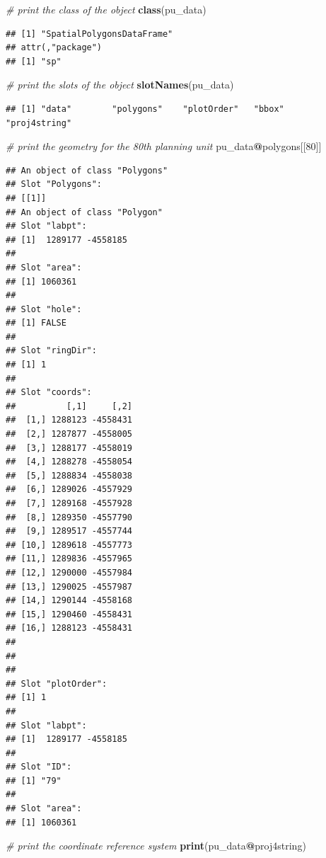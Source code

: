 \documentclass[12pt,]{book}
\newenvironment{Shaded}{\begin{snugshade}}{\end{snugshade}}
\newcommand{\KeywordTok}[1]{\textcolor[rgb]{0.13,0.29,0.53}{\textbf{#1}}}
\newcommand{\DecValTok}[1]{\textcolor[rgb]{0.00,0.00,0.81}{#1}}
\newcommand{\CommentTok}[1]{\textcolor[rgb]{0.56,0.35,0.01}{\textit{#1}}}
\newcommand{\OperatorTok}[1]{\textcolor[rgb]{0.81,0.36,0.00}{\textbf{#1}}}
\newcommand{\NormalTok}[1]{#1}
\begin{document}
\begin{Shaded}
\begin{Highlighting}[]
\CommentTok{# print the class of the object}
\KeywordTok{class}\NormalTok{(pu_data)}
\end{Highlighting}
\end{Shaded}

\begin{verbatim}
## [1] "SpatialPolygonsDataFrame"
## attr(,"package")
## [1] "sp"
\end{verbatim}

\begin{Shaded}
\begin{Highlighting}[]
\CommentTok{# print the slots of the object}
\KeywordTok{slotNames}\NormalTok{(pu_data)}
\end{Highlighting}
\end{Shaded}

\begin{verbatim}
## [1] "data"        "polygons"    "plotOrder"   "bbox"        "proj4string"
\end{verbatim}

\begin{Shaded}
\begin{Highlighting}[]
\CommentTok{# print the geometry for the 80th planning unit}
\NormalTok{pu_data}\OperatorTok{@}\NormalTok{polygons[[}\DecValTok{80}\NormalTok{]]}
\end{Highlighting}
\end{Shaded}

\begin{verbatim}
## An object of class "Polygons"
## Slot "Polygons":
## [[1]]
## An object of class "Polygon"
## Slot "labpt":
## [1]  1289177 -4558185
## 
## Slot "area":
## [1] 1060361
## 
## Slot "hole":
## [1] FALSE
## 
## Slot "ringDir":
## [1] 1
## 
## Slot "coords":
##          [,1]     [,2]
##  [1,] 1288123 -4558431
##  [2,] 1287877 -4558005
##  [3,] 1288177 -4558019
##  [4,] 1288278 -4558054
##  [5,] 1288834 -4558038
##  [6,] 1289026 -4557929
##  [7,] 1289168 -4557928
##  [8,] 1289350 -4557790
##  [9,] 1289517 -4557744
## [10,] 1289618 -4557773
## [11,] 1289836 -4557965
## [12,] 1290000 -4557984
## [13,] 1290025 -4557987
## [14,] 1290144 -4558168
## [15,] 1290460 -4558431
## [16,] 1288123 -4558431
## 
## 
## 
## Slot "plotOrder":
## [1] 1
## 
## Slot "labpt":
## [1]  1289177 -4558185
## 
## Slot "ID":
## [1] "79"
## 
## Slot "area":
## [1] 1060361
\end{verbatim}

\begin{Shaded}
\begin{Highlighting}[]
\CommentTok{# print the coordinate reference system}
\KeywordTok{print}\NormalTok{(pu_data}\OperatorTok{@}\NormalTok{proj4string)}
\end{Highlighting}
\end{Shaded}
\end{document}
